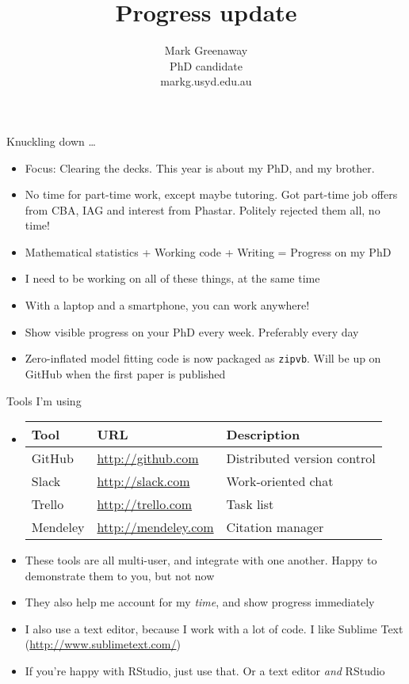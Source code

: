 \documentclass{beamer}
\title{Progress update}
\author{Mark Greenaway\\PhD candidate\\markg\@maths.usyd.edu.au}
\begin{document}
\begin{frame}
\titlepage
\end{frame}

\begin{frame}{Knuckling down \ldots}
\begin{itemize}
\item Focus: Clearing the decks. This year is about my PhD, and my brother.
\item No time for part-time work, except maybe tutoring. Got part-time job offers from CBA, IAG and interest
			from Phastar. Politely rejected them all, no time!
\item Mathematical statistics + Working code + Writing = Progress on my PhD
\item I need to be working on all of these things, at the same time
\item With a laptop and a smartphone, you can work anywhere!
\item Show visible progress on your PhD every week. Preferably every day
\item Zero-inflated model fitting code is now packaged as \texttt{zipvb}. Will be up on GitHub when the
			first paper is published
\end{itemize}
\end{frame}

\begin{frame}{Tools I'm using}
\begin{itemize}
\item \begin{tabular}{|l|l|p{3cm}|}
\hline
Tool & URL & Description \\
\hline
GitHub & \url{http://github.com} & Distributed version control \\
Slack & \url{http://slack.com} & Work-oriented chat \\
Trello & \url{http://trello.com} & Task list\\
Mendeley & \url{http://mendeley.com} & Citation manager
\hline
\end{tabular}
\item These tools are all multi-user, and integrate with one another. Happy to demonstrate them to you, but
			not now
\item They also help me account for my \emph{time}, and show progress immediately
\item I also use a text editor, because I work with a lot of code. I like Sublime Text (\url{http://www.sublimetext.com/})
\item If you're happy with RStudio, just use that. Or a text editor \emph{and} RStudio
\end{itemize}
\end{frame}
\end{document}
